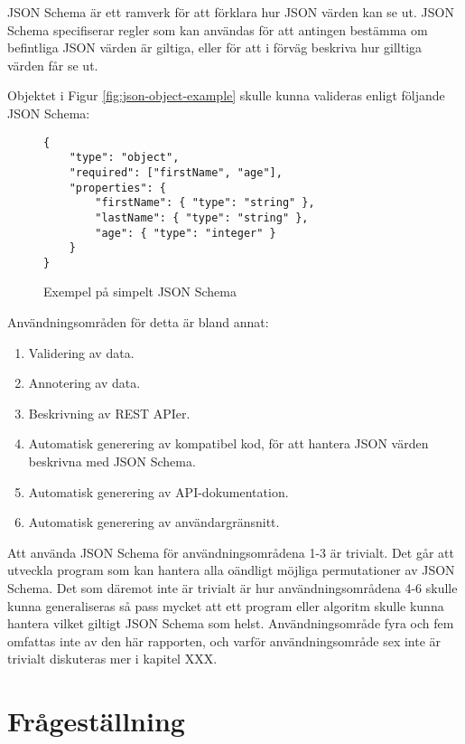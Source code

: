 \documentclass[swedish]{kththesis}
\begin{document}
JSON Schema är ett ramverk för att förklara hur JSON värden kan se ut. JSON Schema specifiserar regler som kan användas för att antingen bestämma om befintliga JSON värden är giltiga, eller för att i förväg beskriva hur gilltiga värden får se ut. 

Objektet i Figur \ref{fig:json-object-example} skulle kunna valideras enligt följande JSON Schema:

\begin{figure}[h]
	\begin{verbatim}
{
	"type": "object",
	"required": ["firstName", "age"],
	"properties": {
		"firstName": { "type": "string" },
		"lastName": { "type": "string" },
		"age": { "type": "integer" }
	}
}
	\end{verbatim}
	\vspace{-1.5em}
	\caption{Exempel på simpelt JSON Schema}
\end{figure}

\noindent
Användningsområden för detta är bland annat:


\begin{enumerate}
	\item Validering av data.
	\item Annotering av data.
	\item Beskrivning av REST APIer.
	\item Automatisk generering av kompatibel kod, för att hantera JSON värden beskrivna med JSON Schema.
	\item Automatisk generering av API-dokumentation.
	\item Automatisk generering av användargränsnitt.
\end{enumerate}

\noindent
Att använda JSON Schema för användningsområdena 1-3 är trivialt. Det går att utveckla program som kan hantera alla oändligt möjliga permutationer av JSON Schema. Det som däremot inte är trivialt är hur användningsområdena 4-6 skulle kunna generaliseras så pass mycket att ett program eller algoritm skulle kunna hantera vilket giltigt JSON Schema som helst. Användningsområde fyra och fem omfattas inte av den här rapporten, och varför användningsområde sex inte är trivialt diskuteras mer i kapitel XXX.




\section{Frågeställning}
\end{document}
